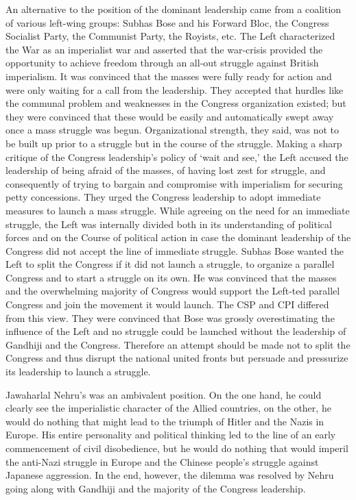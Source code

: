 An alternative to the position of the dominant leadership came from a coalition of various left-wing groups: Subhas Bose and his Forward Bloc, the Congress Socialist Party, the Communist Party, the Royists, etc. The Left characterized the War as an imperialist war and asserted that the war-crisis provided the opportunity to achieve freedom through an all-out struggle against British imperialism. It was convinced that the masses were fully ready for action and were only waiting for a call from the leadership. They accepted that hurdles like the communal problem and weaknesses in the Congress organization existed; but they were convinced that these would be easily and automatically swept away once a mass struggle was begun. Organizational strength, they said, was not to be built up prior to a struggle but in the course of the struggle. Making a sharp critique of the Congress leadership's policy of `wait and see,' the Left accused the leadership of being afraid of the masses, of having lost zest for struggle, and consequently of trying to bargain and compromise with imperialism for securing petty concessions. They urged the Congress leadership to adopt immediate measures to launch a mass struggle. While agreeing on the need for an immediate struggle, the Left was internally divided both in its understanding of political forces and on the Course of political action in case the dominant leadership of the Congress did not accept the line of immediate struggle. Subhas Bose wanted the Left to split the Congress if it did not launch a struggle, to organize a parallel Congress and to start a struggle on its own. He was convinced that the masses and the overwhelming majority of Congress would support the Left-ted parallel Congress and join the movement it would launch. The CSP and CPI differed from this view. They were convinced that Bose was grossly overestimating the influence of the Left and no struggle could be launched without the leadership of Gandhiji and the Congress. Therefore an attempt should be made not to split the Congress and thus disrupt the national united fronts but persuade and pressurize its leadership to launch a struggle. 

Jawaharlal Nehru's was an ambivalent position. On the one hand, he could clearly see the imperialistic character of the Allied countries, on the other, he would do nothing that might lead to the triumph of Hitler and the Nazis in Europe. His entire personality and political thinking led to the line of an early commencement of civil disobedience, but he would do nothing that would imperil the anti-Nazi struggle in Europe and the Chinese people's struggle against Japanese aggression. In the end, however, the dilemma was resolved by Nehru going along with Gandhiji and the majority of the Congress leadership. 

